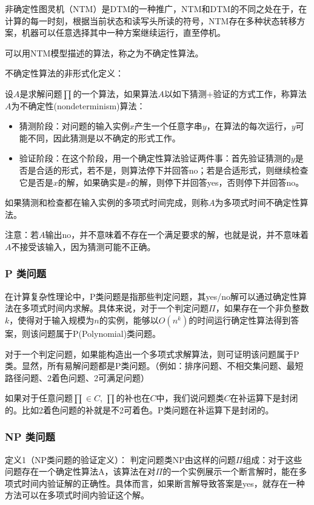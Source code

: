 \documentclass[./../main.tex]{subfiles}
\begin{document}
非确定性图灵机（NTM）是DTM的一种推广，NTM和DTM的不同之处在于，在计算的每一时刻，根据当前状态和读写头所读的符号，NTM存在多种状态转移方案，机器可以任意选择其中一种方案继续运行，直至停机。

可以用NTM模型描述的算法，称之为不确定性算法。

不确定性算法的非形式化定义：

设$A$是求解问题$\prod$的一个算法，如果算法$A$以如下猜测+验证的方式工作，称算法$A$为不确定性(nondeterminism)算法：
\begin{itemize}
    \item 猜测阶段：对问题的输入实例$x$产生一个任意字串$y$，在算法的每次运行，$y$可能不同，因此猜测是以不确定的形式工作。
    \item 验证阶段：在这个阶段，用一个确定性算法验证两件事：首先验证猜测的$y$是否是合适的形式，若不是，则算法停下并回答no；若是合适形式，则继续检查它是否是$x$的解，如果确实是$x$的解，则停下并回答yes，否则停下并回答no。
\end{itemize}

如果猜测和检查都在输入实例的多项式时间完成，则称$A$为多项式时间不确定性算法。

注意：若$A$输出no，并不意味着不存在一个满足要求的解，也就是说，并不意味着$A$不接受该输入，因为猜测可能不正确。

\subsubsection{P 类问题}
在计算复杂性理论中，P类问题是指那些判定问题，其yes/no解可以通过确定性算法在多项式时间内求解。具体来说，对于一个判定问题$\Pi$，如果存在一个非负整数$k$，使得对于输入规模为$n$的实例，能够以$O(n^k)$的时间运行确定性算法得到答案，则该问题属于P(Polynomial)类问题。

对于一个判定问题，如果能构造出一个多项式求解算法，则可证明该问题属于P类。显然，所有易解问题都是P类问题。（例如：排序问题、不相交集问题、最短路径问题、2着色问题、2可满足问题）

如果对于任意问题$\prod\in C$, $\prod$的补也在$C$中，我们说问题类$C$在补运算下是封闭的。比如2着色问题的补就是不2可着色。P类问题在补运算下是封闭的。

\subsubsection{NP 类问题}
定义1（NP类问题的验证定义）：
判定问题类NP由这样的问题$\Pi$组成：对于这些问题存在一个确定性算法A，该算法在对$\Pi$的一个实例展示一个断言解时，能在多项式时间内验证解的正确性。具体而言，如果断言解导致答案是yes，就存在一种方法可以在多项式时间内验证这个解。
\end{document}
